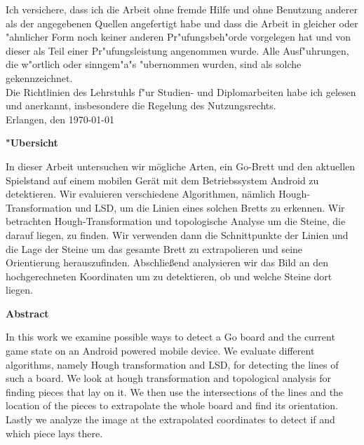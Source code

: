 \documentclass[english,bt]{package/lmedoc}
\begin{document}
\clearpage
  \begin{deckblatt}
  \end{deckblatt}


\cleardoublepage

Ich versichere, dass ich die Arbeit ohne fremde Hilfe und ohne Benutzung
anderer als der angegebenen Quellen angefertigt habe und dass die Arbeit
in gleicher oder "ahnlicher Form noch keiner anderen Pr"ufungsbeh"orde
vorgelegen hat und von dieser als Teil einer Pr"ufungsleistung
angenommen wurde. Alle Ausf"uhrungen, die w"ortlich oder sinngem"a"s
"ubernommen wurden, sind als solche gekennzeichnet.
\\

Die Richtlinien des Lehrstuhls f"ur Studien- und Diplomarbeiten
habe ich gelesen und anerkannt, insbesondere die Regelung des
Nutzungsrechts. \\[15mm]
Erlangen, den \today \hspace{6.0cm} \\[10mm]

\cleardoublepage

\begin{center}
\bfseries
"Ubersicht
\normalfont

In dieser Arbeit untersuchen wir mögliche Arten, ein Go-Brett und den aktuellen Spielstand auf einem mobilen Gerät mit dem Betriebssystem Android zu detektieren. Wir evaluieren verschiedene Algorithmen, nämlich Hough-Transformation und LSD, um die Linien eines solchen Bretts zu erkennen. Wir betrachten Hough-Transformation und topologische Analyse um die Steine, die darauf liegen, zu finden. Wir verwenden dann die Schnittpunkte der Linien und die Lage der Steine um das gesamte Brett zu extrapolieren und seine Orientierung herauszufinden. Abschließend analysieren wir das Bild an den hochgerechneten Koordinaten um zu detektieren, ob und welche Steine dort liegen.
\end{center}


\vspace{5.0cm}

\begin{center}
\bfseries
Abstract
\normalfont

In this work we examine possible ways to detect a Go board and the current game state on an Android powered mobile device. We evaluate different algorithms, namely Hough transformation and LSD, for detecting the lines of such a board.  We look at hough transformation and topological analysis for finding pieces that lay on it. We then use the intersections of the lines and the location of the pieces to extrapolate the whole board and find its orientation. Lastly we analyze the image at the extrapolated coordinates to detect if and which piece lays there.
\end{center}
\end{document}
